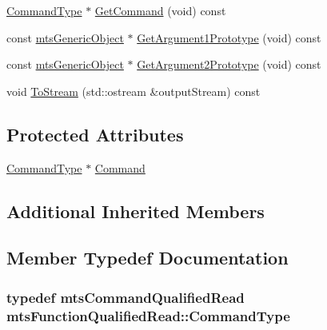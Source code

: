 \begin{DoxyCompactItemize}
\item 
\hyperlink{classmts_function_qualified_read_ae78bcee54ee0392f510d2f33600c316f}{Command\-Type} $\ast$ \hyperlink{classmts_function_qualified_read_a4ccdb978f5633cd5c791f9830341c65c}{Get\-Command} (void) const 
\item 
const \hyperlink{classmts_generic_object}{mts\-Generic\-Object} $\ast$ \hyperlink{classmts_function_qualified_read_a0775c24702c6168fa9a51187a3c199dc}{Get\-Argument1\-Prototype} (void) const 
\item 
const \hyperlink{classmts_generic_object}{mts\-Generic\-Object} $\ast$ \hyperlink{classmts_function_qualified_read_a5fa40186a3f0a87890d38db5ff63c4ce}{Get\-Argument2\-Prototype} (void) const 
\item 
void \hyperlink{classmts_function_qualified_read_afd4e7f95358d09fab3f63f0c2e3ed1ef}{To\-Stream} (std\-::ostream \&output\-Stream) const 
\end{DoxyCompactItemize}
\subsection*{Protected Attributes}
\begin{DoxyCompactItemize}
\item 
\hyperlink{classmts_function_qualified_read_ae78bcee54ee0392f510d2f33600c316f}{Command\-Type} $\ast$ \hyperlink{classmts_function_qualified_read_a7ac0f02300ec56afa037eefb3cb55cef}{Command}
\end{DoxyCompactItemize}
\subsection*{Additional Inherited Members}


\subsection{Member Typedef Documentation}
\hypertarget{classmts_function_qualified_read_ae78bcee54ee0392f510d2f33600c316f}{
\subsubsection[{Command\-Type}]{\setlength{\rightskip}{0pt plus 5cm}typedef {\bf mts\-Command\-Qualified\-Read} {\bf mts\-Function\-Qualified\-Read\-::\-Command\-Type}}}\label{classmts_function_qualified_read_ae78bcee54ee0392f510d2f33600c316f}


